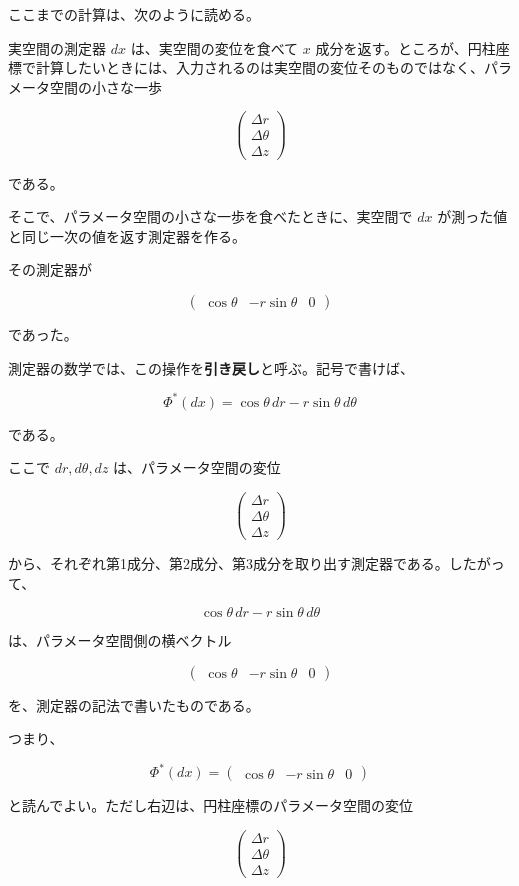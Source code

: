 \documentclass[a4paper,12pt,openany]{book}
\begin{document}
ここまでの計算は、次のように読める。

実空間の測定器 \(dx\) は、実空間の変位を食べて \(x\)
成分を返す。ところが、円柱座標で計算したいときには、入力されるのは実空間の変位そのものではなく、パラメータ空間の小さな一歩

\[
\begin{pmatrix}
\Delta r\\
\Delta\theta\\
\Delta z
\end{pmatrix}
\]

である。

そこで、パラメータ空間の小さな一歩を食べたときに、実空間で \(dx\)
が測った値と同じ一次の値を返す測定器を作る。

その測定器が

\[
\begin{pmatrix}
\cos\theta & -r\sin\theta & 0
\end{pmatrix}
\]

であった。

測定器の数学では、この操作を\textbf{引き戻し}と呼ぶ。記号で書けば、

\[
\Phi^*(dx)
=
\cos\theta\,dr-r\sin\theta\,d\theta
\]

である。

ここで \(dr,d\theta,dz\) は、パラメータ空間の変位

\[
\begin{pmatrix}
\Delta r\\
\Delta\theta\\
\Delta z
\end{pmatrix}
\]

から、それぞれ第1成分、第2成分、第3成分を取り出す測定器である。したがって、

\[
\cos\theta\,dr-r\sin\theta\,d\theta
\]

は、パラメータ空間側の横ベクトル

\[
\begin{pmatrix}
\cos\theta & -r\sin\theta & 0
\end{pmatrix}
\]

を、測定器の記法で書いたものである。

つまり、

\[
\Phi^*(dx)
=
\begin{pmatrix}
\cos\theta & -r\sin\theta & 0
\end{pmatrix}
\]

と読んでよい。ただし右辺は、円柱座標のパラメータ空間の変位

\[
\begin{pmatrix}
\Delta r\\
\Delta\theta\\
\Delta z
\end{pmatrix}
\]
\end{document}
